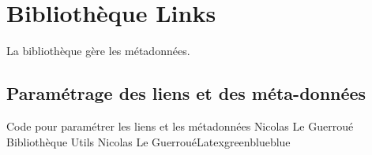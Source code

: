 \chapter{Bibliothèque Links}

La bibliothèque  gère les métadonnées.

\section{Paramétrage des liens et des méta-données}

\begin{Latex}{Code pour paramétrer les liens et les métadonnées}
 {Nicolas Le Guerroué} {Bibliothèque Utils} {Nicolas Le Guerroué}{Latex}{green}{blue}{blue}
    
\end{Latex}


